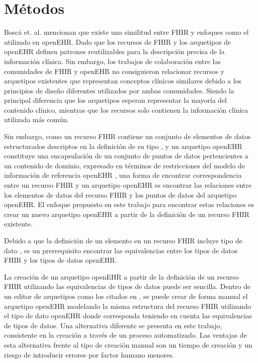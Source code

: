 \section{Métodos}

Boscá et. al. \cite{Bosca15} mencionan que existe una similitud entre FHIR y enfoques como el utilizado en openEHR. Dado que los recursos de FHIR y los arquetipos de openEHR definen patrones reutilizables para la descripción precisa de la información clínica. Sin embargo, los trabajos de colaboración entre las comunidades de FHIR y openEHR \cite{Collaboration} no consiguieron relacionar recursos y arquetipos existentes que representan conceptos clínicos similares debido a los principios de diseño diferentes utilizados por ambas comunidades. Siendo la principal diferencia que los arquetipos esperan representar la mayoría del contenido clínico, mientras que los recursos solo contienen la información clínica utilizada más común.

Sin embargo, como un recurso FHIR contiene un conjunto de elementos de datos estructurados descriptos en la definición de su tipo \cite{FHIRResource}, y un arquetipo openEHR constituye una encapsulación de un conjunto de puntos de datos pertencientes a un contenido de dominio, expresado en términos de restricciones del modelo de información de referencia openEHR \cite{openEHRArchetype}, una forma de encontrar correspondencia entre un recurso FHIR y un arquetipo openEHR es encontrar las relaciones entre los elementos de datos del recurso FHIR y los puntos de datos del arquetipo openEHR. El enfoque propuesto en este trabajo para encontrar estas relaciones es crear un nuevo arquetipo openEHR a partir de la definición de un recurso FHIR existente.

Debido a que la definición de un elemento en un recurso FHIR incluye tipo de dato \cite{FHIRElement}, es un prerrequisito encontrar las equivalencias entre los tipos de datos FHIR y los tipos de datos openEHR.

La creación de un arquetipo openEHR a partir de la definición de un recurso FHIR utilizando las equivalencias de tipos de datos puede ser sencilla. Dentro de un editor de arquetipos como los citados en \cite{openEHRModellingTools}, se puede crear de forma manual el arquetipo openEHR modelando la misma estructura del recurso FHIR utilizando el tipo de dato openEHR donde corresponda teniendo en cuenta las equivalencias de tipos de datos. Una alternativa diferente se presenta en este trabajo, consistente en la creación a través de un proceso automatizado. Las ventajas de esta alternativa frente al tipo de creación manual son un tiempo de creación y un riesgo de introducir errores por factor humano menores.

